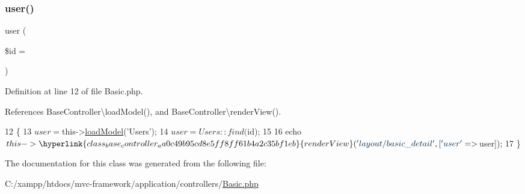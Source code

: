 \hypertarget{class_basic_a6603546e99f9519b86989be128736ad6}{}\label{class_basic_a6603546e99f9519b86989be128736ad6} 
\subsubsection{\texorpdfstring{user()}{user()}}
{\footnotesize\ttfamily user (\begin{DoxyParamCaption}\item[{}]{\$id = {\ttfamily \textquotesingle{}\textquotesingle{}} }\end{DoxyParamCaption})}



Definition at line 12 of file Basic.\+php.



References Base\+Controller\textbackslash{}load\+Model(), and Base\+Controller\textbackslash{}render\+View().


\begin{DoxyCode}
12                                    \{
13         $user = $this->\hyperlink{class_base_controller_a5fa8890bd3a9d20f5c0cc2377dc49eb1}{loadModel}(\textcolor{stringliteral}{'Users'});
14         $user = Users::find($id);
15 
16         echo $this->\hyperlink{class_base_controller_aa0c49b95cd8e5ff8ff61b4a2c35bf1eb}{renderView}(\textcolor{stringliteral}{'layout/basic\_detail'}, [\textcolor{stringliteral}{'user'} => $user]);
17     \}
\end{DoxyCode}


The documentation for this class was generated from the following file\+:\begin{DoxyCompactItemize}
\item 
C\+:/xampp/htdocs/mvc-\/framework/application/controllers/\hyperlink{controllers_2_basic_8php}{Basic.\+php}\end{DoxyCompactItemize}
